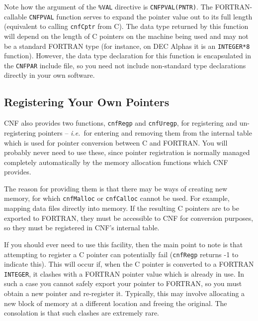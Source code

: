 \documentclass[twoside,11pt]{article}
\newcommand{\htmlref}[2]{#1}
\newcommand{\xlabel}[1]{}
\renewcommand{\_}{\texttt{\symbol{95}}}
\begin{document}
Note how the argument of the \texttt{\%VAL} directive is
\texttt{CNF\_PVAL(PNTR)}. The FORTRAN-callable 
\htmlref{\texttt{CNF\_PVAL}}{CNF_PVAL}
function serves to expand the pointer value out to its full length
(equivalent to calling 
\htmlref{\texttt{cnfCptr}}{cnfCptr}
from C). 
The data type returned by this function will depend on the length of C pointers 
on the machine being used and may not be a standard FORTRAN type (for
instance, on DEC Alphas it is an \texttt{INTEGER*8}
function). However, the data type declaration for this function is
encapsulated in the \texttt{CNF\_PAR} include file, so you need not
include non-standard type declarations directly in your own software.

\subsection{\xlabel{registering_your_own_pointers}Registering Your Own
Pointers}

CNF also provides two functions, 
\htmlref{\texttt{cnfRegp}}{cnfRegp}
and
\htmlref{\texttt{cnfUregp}}{cnfUregp},
for registering and un-registering pointers --
\textit{i.e.}\ for entering and removing them from the internal table which is
used for pointer conversion between C and FORTRAN. You will probably
never need to use these, since pointer registration is normally
managed completely automatically by the memory allocation functions
which CNF provides.

The reason for providing them is that there may be ways of
creating new memory, for which \texttt{cnfMalloc} or \texttt{cnfCalloc} cannot
be used.
For example, mapping data files directly into memory. 
If the resulting C pointers are to be exported to FORTRAN,
they must be accessible to CNF for conversion purposes, so they must
be registered in CNF's internal table.

If you should ever need to use this facility, then the main point to
note is that attempting to register a C pointer can potentially fail
(\htmlref{\texttt{cnfRegp}}{cnfRegp} returns -1 to indicate this). 
This will occur if, when the C pointer is converted to a FORTRAN 
\texttt{INTEGER}, it
clashes with a FORTRAN pointer value which is already in use. In such
a case you cannot safely export your pointer to FORTRAN, so you must
obtain a new pointer and re-register it. Typically, this may involve
allocating a new block of memory at a different location and freeing
the original. The consolation is that such clashes are extremely rare.
\end{document}
